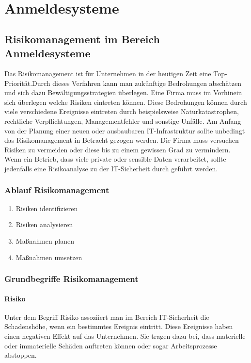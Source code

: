 \chapter{Anmeldesysteme}

\section{Risikomanagement im Bereich Anmeldesysteme}
Das Risikomanagement ist für Unternehmen in der heutigen Zeit eine Top-Priorität.Durch dieses Verfahren kann man zukünftige Bedrohungen abschätzen und sich dazu Bewältigungsstrategien überlegen. Eine Firma muss im Vorhinein sich überlegen welche Risiken eintreten können. Diese Bedrohungen können durch viele verschiedene Ereignisse eintreten durch beispielsweise Naturkatastrophen, rechtliche Verpflichtungen, Managementfehler und sonstige Unfälle.
Am Anfang von der Planung einer neuen oder ausbaubaren IT-Infrastruktur sollte unbedingt das Risikomanagement in Betracht gezogen werden. Die Firma muss versuchen Risiken zu vermeiden oder diese bis zu einem gewissen Grad zu vermindern. Wenn ein Betrieb, dass viele private oder sensible Daten verarbeitet, sollte jedenfalls eine Risikoanalyse zu der IT-Sicherheit durch geführt werden. 
\newpage

\subsection{Ablauf Risikomanagement}
\begin{enumerate}
    \item Risiken identifizieren
    \item Risiken analysieren
    \item Maßnahmen planen
    \item Maßnahmen umsetzen
\end{enumerate}


\subsection{Grundbegriffe Risikomanagement}
\subsubsection{Risiko}
Unter dem Begriff Risiko assoziiert man im Bereich IT-Sicherheit die Schadenshöhe, wenn ein bestimmtes Ereignis eintritt. Diese Ereignisse haben einen negativen Effekt auf das Unternehmen. Sie tragen dazu bei, dass materielle oder immaterielle Schäden auftreten können oder sogar Arbeitsprozesse abstoppen.
\\

